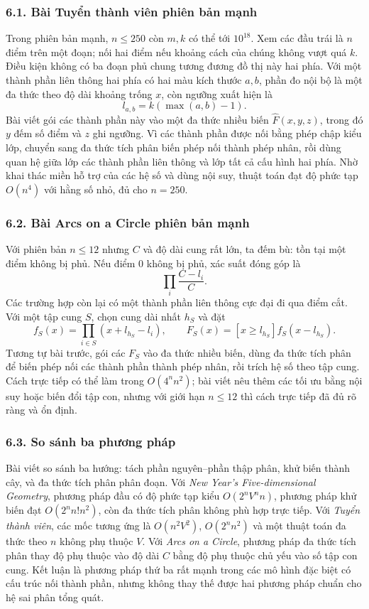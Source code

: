 \documentclass[11pt]{article}
\begin{document}
\subsubsection*{6.1. Bài Tuyển thành viên phiên bản mạnh}

Trong phiên bản mạnh, \(n\le 250\) còn \(m,k\) có thể tới \(10^{18}\). Xem các
đầu trái là \(n\) điểm trên một đoạn; nối hai điểm nếu khoảng cách của chúng
không vượt quá \(k\). Điều kiện không có ba đoạn phủ chung tương đương đồ thị
này hai phía. Với một thành phần liên thông hai phía có hai màu kích thước
\(a,b\), phần đo nội bộ là một đa thức theo độ dài khoảng trống \(x\), còn
ngưỡng xuất hiện là
\[
  l_{a,b}=k(\max(a,b)-1).
\]
Bài viết gói các thành phần này vào một đa thức nhiều biến \(\hat F(x,y,z)\),
trong đó \(y\) đếm số điểm và \(z\) ghi ngưỡng. Vì các thành phần được nối bằng
phép chập kiểu lớp, chuyển sang đa thức tích phân biến phép nối thành phép
nhân, rồi dùng quan hệ giữa lớp các thành phần liên thông và lớp tất cả cấu
hình hai phía. Nhờ khai thác miền hỗ trợ của các hệ số và dùng nội suy, thuật
toán đạt độ phức tạp \(O(n^4)\) với hằng số nhỏ, đủ cho \(n=250\).

\subsubsection*{6.2. Bài Arcs on a Circle phiên bản mạnh}

Với phiên bản \(n\le 12\) nhưng \(C\) và độ dài cung rất lớn, ta đếm bù: tồn
tại một điểm không bị phủ. Nếu điểm \(0\) không bị phủ, xác suất đóng góp là
\[
  \prod_i \frac{C-l_i}{C}.
\]
Các trường hợp còn lại có một thành phần liên thông cực đại đi qua điểm cắt.
Với một tập cung \(S\), chọn cung dài nhất \(h_S\) và đặt
\[
  f_S(x)=\prod_{i\in S}(x+l_{h_S}-l_i),\qquad
  F_S(x)=[x\ge l_{h_S}]f_S(x-l_{h_S}).
\]
Tương tự bài trước, gói các \(F_S\) vào đa thức nhiều biến, dùng đa thức tích
phân để biến phép nối các thành phần thành phép nhân, rồi trích hệ số theo tập
cung. Cách trực tiếp có thể làm trong \(O(4^n n^2)\); bài viết nêu thêm các
tối ưu bằng nội suy hoặc biến đổi tập con, nhưng với giới hạn \(n\le 12\) thì
cách trực tiếp đã đủ rõ ràng và ổn định.

\subsubsection*{6.3. So sánh ba phương pháp}

Bài viết so sánh ba hướng: tách phần nguyên--phần thập phân, khử biến thành
cây, và đa thức tích phân phân đoạn. Với \emph{New Year's Five-dimensional
Geometry}, phương pháp đầu có độ phức tạp kiểu \(O(2^nV^n n)\), phương pháp
khử biến đạt \(O(2^n n! n^2)\), còn đa thức tích phân không phù hợp trực tiếp.
Với \emph{Tuyển thành viên}, các mốc tương ứng là \(O(n^2V^2)\),
\(O(2^n n^2)\) và một thuật toán đa thức theo \(n\) không phụ thuộc \(V\). Với
\emph{Arcs on a Circle}, phương pháp đa thức tích phân thay độ phụ thuộc vào
độ dài \(C\) bằng độ phụ thuộc chủ yếu vào số tập con cung. Kết luận là phương
pháp thứ ba rất mạnh trong các mô hình đặc biệt có cấu trúc nối thành phần,
nhưng không thay thế được hai phương pháp chuẩn cho hệ sai phân tổng quát.
\end{document}
